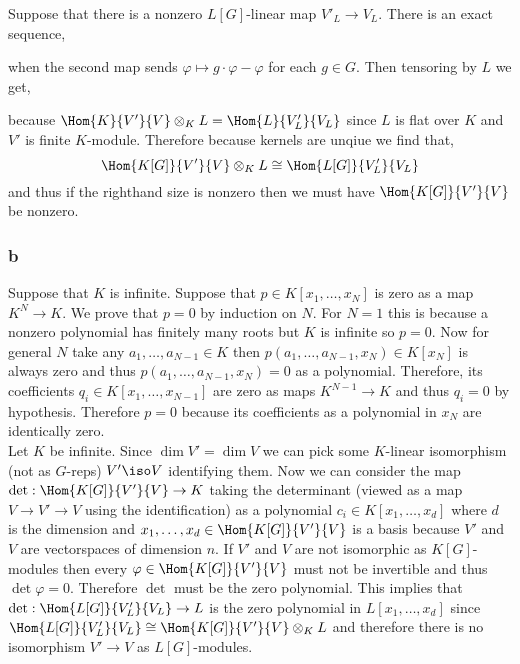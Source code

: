\documentclass[12pt]{article}
\begin{document}
Suppose that there is a nonzero $L[G]$-linear map $V'_L \to V_L$. There is an exact sequence,
\begin{center}
\end{center}
when the second map sends $\varphi \mapsto g \cdot \varphi - \varphi$ for each $g \in G$. Then tensoring by $L$ we get,
\begin{center}
\end{center}
because $\Hom{K}{V'}{V} \otimes_K L = \Hom{L}{V'_L}{V_L}$ since $L$ is flat over $K$ and $V'$ is finite $K$-module. Therefore because kernels are unqiue we find that,
\[ \Hom{K[G]}{V'}{V} \otimes_K L \cong \Hom{L[G]}{V'_L}{V_L} \]
and thus if the righthand size is nonzero then we must have $\Hom{K[G]}{V'}{V}$ be nonzero.

\subsubsection{b}

Suppose that $K$ is infinite. Suppose that $p \in K[x_1, \dots, x_N]$ is zero as a map $K^N \to K$. We prove that $p = 0$ by induction on $N$. For $N = 1$ this is because a nonzero polynomial has finitely many roots but $K$ is infinite so $p = 0$. Now for general $N$ take any $a_1, \dots, a_{N-1} \in K$ then $p(a_1, \dots, a_{N-1}, x_N) \in K[x_N]$ is always zero and thus $p(a_1, \dots, a_{N-1}, x_N) = 0$ as a polynomial. Therefore, its coefficients $q_i \in K[x_1, \dots, x_{N-1}]$ are zero as maps $K^{N-1} \to K$ and thus $q_i = 0$ by hypothesis. Therefore $p = 0$ because its coefficients as a polynomial in $x_N$ are identically zero. 
\bigskip\\
Let $K$ be infinite. Since $\dim{V'} = \dim{V}$ we can pick some $K$-linear isomorphism (not as $G$-reps) $V' \iso V$ identifying them. Now we can consider the map $\det : \Hom{K[G]}{V'}{V} \to K$ taking the determinant (viewed as a map $V \to V' \to V$ using the identification) as a polynomial $c_i \in K[x_1, \dots, x_{d}]$ where $d$ is the dimension and $x_1, \dots, x_d \in \Hom{K[G]}{V'}{V}$ is a basis because $V'$ and $V$ are vectorspaces of dimension $n$. If $V'$ and $V$ are not isomorphic as $K[G]$-modules then every $\varphi \in \Hom{K[G]}{V'}{V}$ must not be invertible and thus $\det{\varphi} = 0$. Therefore $\det$ must be the zero polynomial. This implies that $\det : \Hom{L[G]}{V'_L}{V_L} \to L$ is the zero polynomial in $L[x_1, \dots, x_d]$ since $\Hom{L[G]}{V'_L}{V_L} \cong \Hom{K[G]}{V'}{V} \otimes_K L$ and therefore there is no isomorphism $V' \to V$ as $L[G]$-modules.
\end{document}
